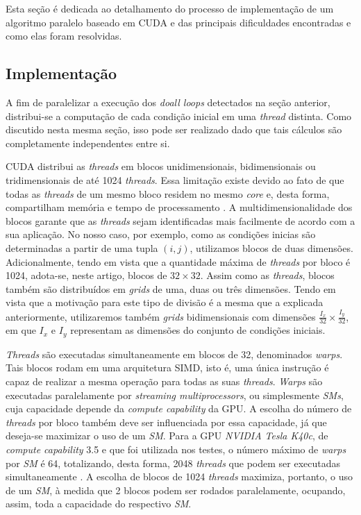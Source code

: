 \documentclass[12pt]{article}
\begin{document}
Esta seção é dedicada ao detalhamento do processo de implementação de um
algoritmo paralelo baseado em CUDA e das principais dificuldades encontradas e
como elas foram resolvidas.

\subsection{Implementação}

A fim de paralelizar a execução dos \textit{doall loops} detectados na seção
anterior, distribui-se a computação de cada condição inicial em uma
\textit{thread} distinta. Como discutido nesta mesma seção, isso pode ser
realizado dado que tais cálculos são completamente independentes entre si.

CUDA distribui as \textit{threads} em blocos unidimensionais, bidimensionais ou
tridimensionais de até 1024 \textit{threads}. Essa limitação existe devido ao
fato de que todas as \textit{threads} de um mesmo bloco residem no mesmo
\textit{core} e, desta forma, compartilham memória e tempo de processamento
\cite{cuda}. A multidimensionalidade dos blocos garante que as \textit{threads}
sejam identificadas mais facilmente de acordo com a sua aplicação. No nosso
caso, por exemplo, como as condições inicias são determinadas a partir de uma
tupla \((i,j)\), utilizamos blocos de duas dimensões. Adicionalmente, tendo em
vista que a quantidade máxima de \textit{threads} por bloco é 1024, adota-se,
neste artigo, blocos de \(32\times32\). Assim como as \textit{threads}, blocos
também são distribuídos em \textit{grids} de uma, duas ou três dimensões. Tendo
em vista que a motivação para este tipo de divisão é a mesma que a explicada
anteriormente, utilizaremos também \textit{grids} bidimensionais com dimensões
\(\frac{I_x}{32}\times\frac{I_y}{32}\), em que \(I_x\) e \(I_y\) representam as
dimensões do conjunto de condições iniciais.

\textit{Threads} são executadas simultaneamente em blocos de 32, denominados
\textit{warps}. Tais blocos rodam em uma arquitetura SIMD, isto é, uma única
instrução é capaz de realizar a mesma operação para todas as suas
\textit{threads}. \textit{Warps} são executadas paralelamente por
\textit{streaming multiprocessors}, ou simplesmente \textit{SMs}, cuja
capacidade depende da \textit{compute capability} da GPU. A escolha do número de
\textit{threads} por bloco também deve ser influenciada por essa capacidade, já
que deseja-se maximizar o uso de um \textit{SM}. Para a GPU \textit{NVIDIA Tesla
K40c}, de \textit{compute capability} 3.5 e que foi utilizada nos testes, o
número máximo de \textit{warps} por \textit{SM} é 64, totalizando, desta forma,
2048 \textit{threads} que podem ser executadas simultaneamente \cite{compute}. A
escolha de blocos de 1024 \textit{threads} maximiza, portanto, o uso de um
\textit{SM}, à medida que 2 blocos podem ser rodados paralelamente, ocupando,
assim, toda a capacidade do respectivo \textit{SM}.
\end{document}
